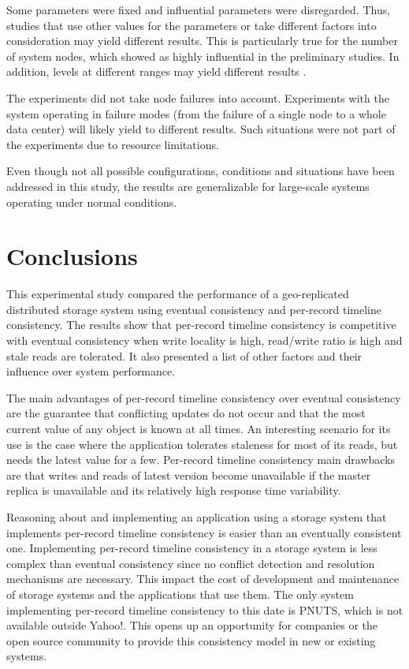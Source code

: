 \documentclass[man,floatsintext,12pt]{apa6}
\begin{document}
Some parameters were fixed and influential parameters were disregarded. Thus,
studies that use other values for the parameters or take different factors into
consideration may yield different results. This is particularly true for the
number of system nodes, which showed as highly influential in the preliminary
studies. In addition, levels at different ranges may yield different results
\parencite{Jain1991}.

The experiments did not take node failures into account. Experiments with the
system operating in failure modes (from the failure of a single node to a
whole data center) will likely yield to different results. Such situations were
not part of the experiments due to resource limitations.

Even though not all possible configurations, conditions and situations have
been addressed in this study, the results are generalizable for large-scale
systems operating under normal conditions.

\section{Conclusions}

This experimental study compared the performance of a geo-replicated
distributed storage system using eventual consistency and per-record timeline
consistency. The results show that per-record timeline consistency is
competitive with eventual consistency when write locality is high, read/write
ratio is high and stale reads are tolerated. It also presented a list of other
factors and their influence over system performance.

The main advantages of per-record timeline consistency over eventual
consistency are the guarantee that conflicting updates do not occur and that
the most current value of any object is known at all times. An interesting
scenario for its use is the case where the application tolerates staleness for
most of its reads, but needs the latest value for a few. Per-record
timeline consistency main drawbacks are that writes and reads of latest version
become unavailable if the master replica is unavailable and its relatively high
response time variability.

Reasoning about and implementing an application using a storage system that
implements per-record timeline consistency is easier than an eventually
consistent one. Implementing per-record timeline consistency in a storage
system is less complex than eventual consistency since no conflict detection
and resolution mechanisms are necessary. This impact the cost of development
and maintenance of storage systems and the applications that use them. The only
system implementing per-record timeline consistency to this date is PNUTS,
which is not available outside Yahoo!. This opens up an opportunity for
companies or the open source community to provide this consistency model in new
or existing systems.
\end{document}
